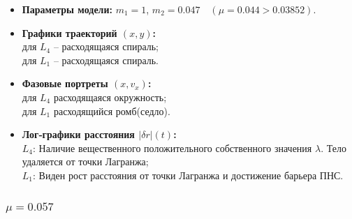 \documentclass[12pt]{article}
\begin{document}
\begin{itemize}
  \item \textbf{Параметры модели:} $m_1=1$, $m_2=0.047\quad(\mu=0.044>0.03852)$.
  \item \textbf{Графики траекторий $(x,y)$:}\\
        для $L_4$ -- расходящаяся спираль;\\
        для $L_1$ -- расходящаяся спираль. 
  \item \textbf{Фазовые портреты $(x,v_x)$:}\\
        для $L_4$ расходящаяся окружность;\\
        для $L_1$ расходящийся ромб(седло).
  \item \textbf{Лог‑графики расстояния $|\delta r|(t)$:}\\
        $L_4$:  Наличие вещественного положительного собственного значения $\lambda$. Тело удаляется от точки Лагранжа;\\
        $L_1$: Виден рост расстояния от точки Лагранжа и достижение барьера ПНС.
\end{itemize}

\subsubsection{$\mu=0.057$} 
\end{document}
